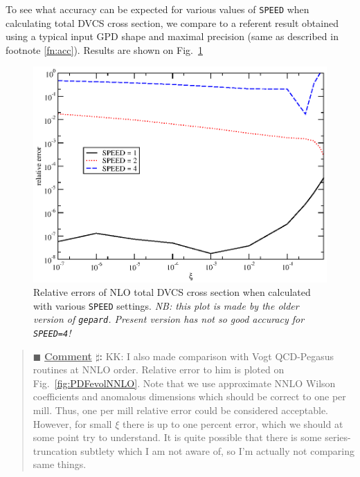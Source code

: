 \documentclass[12pt]{article}
\newcounter{comment}
\newenvironment{commblock}%
{\refstepcounter{comment}%
\begin{quote}\renewcommand{\baselinestretch}{1}
\ttfamily\small$\blacksquare$ \textbf{\underline{Comment} $\sharp$\thecomment:}}%
{\end{quote}}
\begin{document}
To see what accuracy can be expected for various values of \texttt{SPEED} when calculating total
DVCS cross section, we compare to a referent result obtained using a typical input GPD shape and
maximal precision (same as described in footnote \ref{fn:acc}). Results are shown on
Fig.~\ref{fig:acc}

\begin{figure}
\begin{center}
\includegraphics[scale=0.8]{acc}
\end{center}
\caption{Relative errors of NLO total DVCS cross section when calculated with various
\texttt{SPEED} settings. \emph{NB: this plot is made
by the older version of \texttt{gepard}. Present version has not so good
accuracy for \texttt{SPEED=4}!}}
\label{fig:acc}
\end{figure}

\begin{commblock}
KK: I also made comparison with Vogt QCD-Pegasus routines at NNLO order. Relative error to
him is ploted on Fig.~\ref{fig:PDFevolNNLO}. Note that we use approximate NNLO
Wilson coefficients and anomalous dimensions which should be correct to one per mill.
Thus, one per mill relative error could be considered acceptable. However, for
small $\xi$ there is up to one percent error, which we should at some point try to understand.
It is quite possible that there is some series-truncation subtlety which I am not
aware of, so I'm actually not comparing same things.
\end{commblock}
\end{document}

